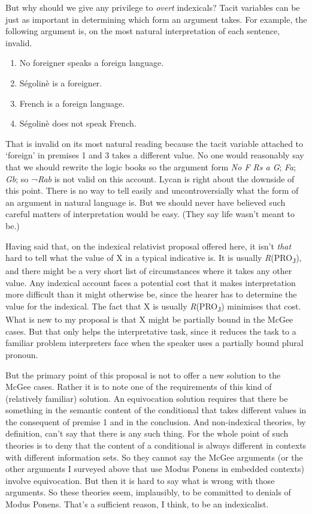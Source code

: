 \documentclass[
  11pt,
  letterpaper,
  DIV=11,
  numbers=noendperiod,
  twoside]{scrartcl}
\providecommand{\tightlist}{%
  \setlength{\itemsep}{0pt}\setlength{\parskip}{0pt}}
\begin{document}
But why should we give any privilege to \emph{overt} indexicals? Tacit
variables can be just as important in determining which form an argument
takes. For example, the following argument is, on the most natural
interpretation of each sentence, invalid.

\begin{enumerate}
\def\labelenumi{\arabic{enumi}.}
\tightlist
\item
  No foreigner speaks a foreign language.
\item
  Ségolinè is a foreigner.
\item
  French is a foreign language.
\item
  Ségolinè does not speak French.
\end{enumerate}

That is invalid on its most natural reading because the tacit variable
attached to `foreign' in premises 1 and 3 takes a different value. No
one would reasonably say that we should rewrite the logic books so the
argument form \emph{No F Rs a G}; \emph{Fa}; \emph{Gb}; so ¬\emph{Rab}
is not valid on this account. Lycan is right about the downside of this
point. There is no way to tell easily and uncontroversially what the
form of an argument in natural language is. But we should never have
believed such careful matters of interpretation would be easy. (They say
life wasn't meant to be.)

Having said that, on the indexical relativist proposal offered here, it
isn't \emph{that} hard to tell what the value of X in a typical
indicative is. It is usually \emph{R}(PRO\textsubscript{J}), and there
might be a very short list of circumstances where it takes any other
value. Any indexical account faces a potential cost that it makes
interpretation more difficult than it might otherwise be, since the
hearer has to determine the value for the indexical. The fact that X is
usually \emph{R}(PRO\textsubscript{J}) minimises that cost. What is new
to my proposal is that X might be partially bound in the McGee cases.
But that only helps the interpretative task, since it reduces the task
to a familiar problem interpreters face when the speaker uses a
partially bound plural pronoun.

But the primary point of this proposal is not to offer a new solution to
the McGee cases. Rather it is to note one of the requirements of this
kind of (relatively familiar) solution. An equivocation solution
requires that there be something in the semantic content of the
conditional that takes different values in the consequent of premise 1
and in the conclusion. And non-indexical theories, by definition, can't
say that there is any such thing. For the whole point of such theories
is to deny that the content of a conditional is always different in
contexts with different information sets. So they cannot say the McGee
arguments (or the other arguments I surveyed above that use Modus Ponens
in embedded contexts) involve equivocation. But then it is hard to say
what is wrong with those arguments. So these theories seem, implausibly,
to be committed to denials of Modus Ponens. That's a sufficient reason,
I think, to be an indexicalist.
\end{document}
